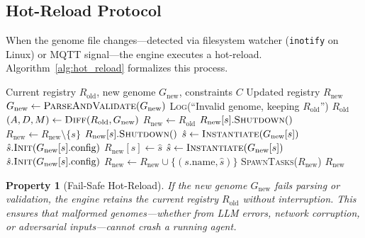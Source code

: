 \documentclass{article}
\newtheorem{property}{Property}
\begin{document}
\subsection{Hot-Reload Protocol}

When the genome file changes---detected via filesystem watcher (\texttt{inotify} on Linux) or MQTT signal---the engine executes a hot-reload. Algorithm~\ref{alg:hot_reload} formalizes this process.

\begin{algorithm}[t]
\caption{Genome Hot-Reload with Consistency Guarantee}
\label{alg:hot_reload}
\begin{algorithmic}[1]
\REQUIRE Current registry $R_{\text{old}}$, new genome $G_{\text{new}}$, constraints $C$
\ENSURE Updated registry $R_{\text{new}}$
\STATE $G_{\text{new}} \leftarrow \textsc{ParseAndValidate}(G_{\text{new}})$
    \STATE \textsc{Log}(``Invalid genome, keeping $R_{\text{old}}$'')
    \RETURN $R_{\text{old}}$ 
\ENDIF
\STATE $(A, D, M) \leftarrow \textsc{Diff}(R_{\text{old}}, G_{\text{new}})$ 
\STATE $R_{\text{new}} \leftarrow R_{\text{old}}$
 
    \STATE $R_{\text{new}}[s].\textsc{Shutdown}()$
    \STATE $R_{\text{new}} \leftarrow R_{\text{new}} \setminus \{s\}$
\ENDFOR
{} 
    \STATE $R_{\text{new}}[s].\textsc{Shutdown}()$
    \STATE $\hat{s} \leftarrow \textsc{Instantiate}(G_{\text{new}}[s])$
    \STATE $\hat{s}.\textsc{Init}(G_{\text{new}}[s].\text{config})$
    \STATE $R_{\text{new}}[s] \leftarrow \hat{s}$
\ENDFOR
{} 
        \STATE $\hat{s} \leftarrow \textsc{Instantiate}(G_{\text{new}}[s])$
        \STATE $\hat{s}.\textsc{Init}(G_{\text{new}}[s].\text{config})$
        \STATE $R_{\text{new}} \leftarrow R_{\text{new}} \cup \{(s.\text{name}, \hat{s})\}$
    \ENDIF
\ENDFOR
\STATE \textsc{SpawnTasks}($R_{\text{new}}$) 
\RETURN $R_{\text{new}}$
\end{algorithmic}
\end{algorithm}

\begin{property}[Fail-Safe Hot-Reload]
If the new genome $G_{\text{new}}$ fails parsing or validation, the engine retains the current registry $R_{\text{old}}$ without interruption. This ensures that malformed genomes---whether from LLM errors, network corruption, or adversarial inputs---cannot crash a running agent.
\end{property}
\end{document}
